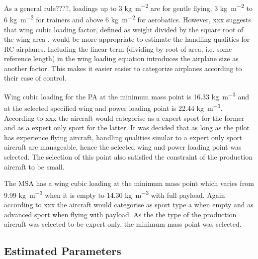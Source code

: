 

As a general rule????, loadings up to 3 \si{\kilo\gram\per\meter\squared} are for gentle flying, 3 \si{\kilo\gram\per\meter\squared} to 6 \si{\kilo\gram\per\meter\squared} for trainers and above 6 \si{\kilo\gram\per\meter\squared} for aerobatics. However, xxx suggests that wing cubic loading factor, defined as weight divided by the square root of the wing area , would be more appropriate to estimate the handling qualities for RC airplanes. Including the linear term (dividing by root of area, i.e. some reference length) in the wing loading equation introduces the airplane size as another factor. This makes it easier easier to categorize airplanes according to their ease of control. 

Wing cubic loading for the PA at the minimum mass point is 16.33 \si{\kilo\gram\per\meter\cubed} and at the selected specified wing and power loading point is 22.44 \si{\kilo\gram\per\meter\cubed}. According to xxx the aircraft would categorise as a expert sport for the former and as a expert only sport for the latter. It was decided that as long as the pilot has experience flying aircraft, handling qualities similar to a expert only sport aircraft are manageable, hence the selected wing and power loading point was selected. The selection of this point also satisfied the constraint of the production aircraft to be small.

The MSA has a wing cubic loading at the minimum mass point which varies from 9.99 \si{\kilo\gram\per\meter\cubed} when it is empty to 14.30 \si{\kilo\gram\per\meter\cubed} with full payload. Again according to xxx the aircraft would categorise as sport type a when empty and as advanced sport when flying with payload. As the the type of the production aircraft was selected to be expert only, the minimum mass point was selected.



\newpage 
\subsection{Estimated Parameters}


\newpage 



